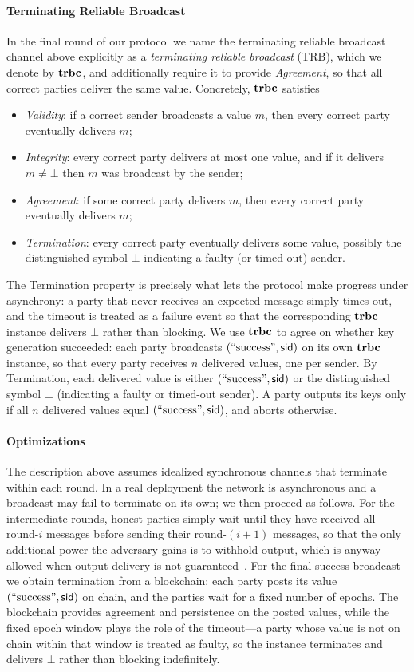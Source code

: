 \paragraph{Terminating Reliable Broadcast}
In the final round of our protocol we name the terminating reliable broadcast channel above
explicitly as a \emph{terminating reliable broadcast} (TRB), which we denote by $\mathbf{trbc}$, and
additionally require it to provide \emph{Agreement}, so that all correct parties deliver the
same value. Concretely, $\mathbf{trbc}$ satisfies
\begin{itemize}
\item \emph{Validity}: if a correct sender broadcasts a value $m$, then every correct party eventually delivers $m$;
\item \emph{Integrity}: every correct party delivers at most one value, and if it delivers $m \neq \bot$ then $m$ was broadcast by the sender;
\item \emph{Agreement}: if some correct party delivers $m$, then every correct party eventually delivers $m$;
\item \emph{Termination}: every correct party eventually delivers some value, possibly the distinguished symbol $\bot$ indicating a faulty (or timed-out) sender.
\end{itemize}
The Termination property is precisely what lets the protocol make progress under asynchrony:
a party that never receives an expected message simply times out, and the timeout is treated
as a failure event so that the corresponding $\mathbf{trbc}$ instance delivers $\bot$ rather than blocking.
We use $\mathbf{trbc}$ to agree on whether key generation succeeded: each party broadcasts
$(\text{``success''}, \mathsf{sid})$ on its own $\mathbf{trbc}$ instance, so that every party receives $n$ delivered values, one
per sender. By Termination, each delivered value is either $(\text{``success''}, \mathsf{sid})$ or the distinguished
symbol $\bot$ (indicating a faulty or timed-out sender). A party outputs its keys only if all
$n$ delivered values equal $(\text{``success''}, \mathsf{sid})$, and aborts otherwise.

\paragraph{Optimizations}
The description above assumes idealized synchronous channels that terminate within each round.
In a real deployment the network is asynchronous and a broadcast may fail to terminate on its own;
we then proceed as follows. For the intermediate rounds, honest parties simply wait until they have
received all round-$i$ messages before sending their round-$(i+1)$ messages, so that the only
additional power the adversary gains is to withhold output, which is anyway allowed when output
delivery is not guaranteed~\cite{GoldwasserLindell02}. For the final success broadcast we obtain
termination from a blockchain: each party posts its value $(\text{``success''}, \mathsf{sid})$ on chain, and the parties
wait for a fixed number of epochs. The blockchain provides agreement and persistence on the posted
values, while the fixed epoch window plays the role of the timeout---a party whose value is not on
chain within that window is treated as faulty, so the instance terminates and delivers $\bot$ rather
than blocking indefinitely.


